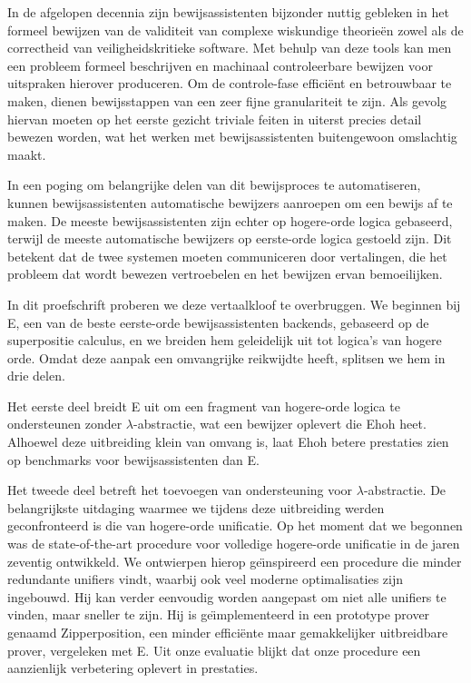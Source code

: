 {

In de afgelopen decennia zijn bewijsassistenten bijzonder nuttig gebleken in het formeel bewijzen van de validiteit van complexe wiskundige theorie\"en zowel als de correctheid van veiligheidskritieke software. Met behulp van deze tools kan men een probleem formeel beschrijven en machinaal controleerbare bewijzen voor uitspraken hierover produceren. Om de controle-fase effici\"ent en betrouwbaar te maken, dienen bewijsstappen van een zeer fijne granulariteit te zijn. Als gevolg hiervan moeten op het eerste gezicht triviale feiten in uiterst precies detail bewezen worden, wat het werken met bewijsassistenten buitengewoon omslachtig maakt.

In een poging om belangrijke delen van dit bewijsproces te automatiseren, kunnen bewijsassistenten automatische bewijzers aanroepen om een bewijs af te maken. De meeste bewijsassistenten zijn echter op hogere-orde logica gebaseerd, terwijl de meeste automatische bewijzers op eerste-orde logica gestoeld zijn. Dit betekent dat de twee systemen moeten communiceren door vertalingen, die het probleem dat wordt bewezen vertroebelen en het bewijzen ervan bemoeilijken.

In dit proefschrift proberen we deze vertaalkloof te overbruggen. We beginnen bij E, een van de beste eerste-orde bewijsassistenten backends, gebaseerd op de superpositie calculus, en we breiden hem geleidelijk uit tot logica's van hogere orde. Omdat deze aanpak een omvangrijke reikwijdte heeft, splitsen we hem in drie delen.

Het eerste deel breidt E uit om een fragment van hogere-orde logica te ondersteunen zonder $\lambda$-abstractie, wat een bewijzer oplevert die Ehoh heet. Alhoewel deze uitbreiding klein van omvang is, laat Ehoh betere prestaties zien op benchmarks voor bewijsassistenten dan E.

Het tweede deel betreft het toevoegen van ondersteuning voor $\lambda$-abstractie. De belangrijkste uitdaging waarmee we tijdens deze uitbreiding werden geconfronteerd is die van hogere-orde unificatie. Op het moment dat we begonnen was de state-of-the-art procedure voor volledige hogere-orde unificatie in de jaren zeventig ontwikkeld. We ontwierpen hierop ge\"{\i}nspireerd een procedure die minder redundante unifiers vindt, waarbij ook veel moderne optimalisaties zijn ingebouwd. Hij kan verder eenvoudig worden aangepast om niet alle unifiers te vinden, maar sneller te zijn. Hij is ge\"{\i}mplementeerd in een prototype prover genaamd Zipperposition, een minder effici\"ente maar gemakkelijker uitbreidbare prover, vergeleken met E. Uit onze evaluatie blijkt dat onze procedure een aanzienlijk verbetering oplevert in prestaties.

}
